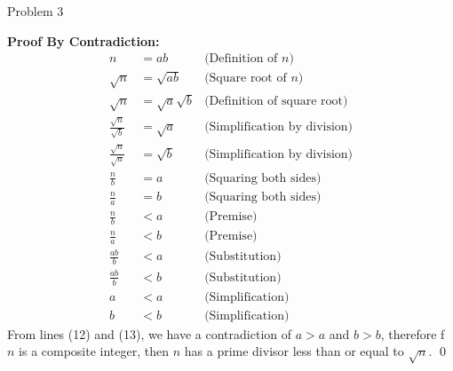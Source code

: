 \begin{problem}{Problem 3}
\begin{highlight}
        \noindent \textbf{Proof By Contradiction:}
        \begin{align}
            n & = ab & \text{(Definition of $n$)} \\
            \sqrt{n} & = \sqrt{ab} & \text{(Square root of $n$)} \\
            \sqrt{n} & = \sqrt{a}\sqrt{b} & \text{(Definition of square root)} \\
            \frac{\sqrt{n}}{\sqrt{b}} & = \sqrt{a} & \text{(Simplification by division)} \\
            \frac{\sqrt{n}}{\sqrt{a}} & = \sqrt{b} & \text{(Simplification by division)} \\
            \frac{n}{b} & = a & \text{(Squaring both sides)} \\
            \frac{n}{a} & = b & \text{(Squaring both sides)} \\
            \frac{n}{b} & < a & \text{(Premise)} \\
            \frac{n}{a} & < b & \text{(Premise)} \\
            \frac{ab}{b} & < a & \text{(Substitution)} \\
            \frac{ab}{b} & < b & \text{(Substitution)} \\
            a & < a & \text{(Simplification)} \\
            b & < b & \text{(Simplification)}
        \end{align}
        From lines (12) and (13), we have a contradiction of $a > a$ and $b > b$, therefore f $n$ is a composite integer, then $n$ has a prime divisor less than or equal to $\sqrt{n}$. \qed
    \end{highlight}
\end{problem}

